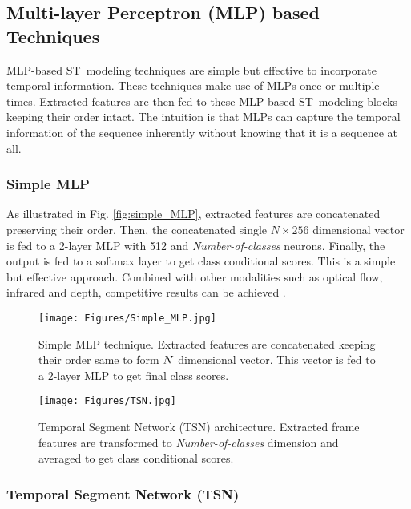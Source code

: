 \documentclass[runningheads]{llncs}
\begin{document}
\subsection{Multi-layer Perceptron (MLP) based Techniques}

MLP-based ST~modeling techniques are simple but effective to incorporate temporal information. These techniques make use of MLPs once or multiple times. Extracted features are then fed to these MLP-based ST~modeling blocks keeping their order intact. The intuition is that MLPs can capture the temporal information of the sequence inherently without knowing that it is a sequence at all.   

\subsubsection{Simple MLP} 

As illustrated in Fig. \ref{fig:simple_MLP}, extracted features are concatenated preserving their order. Then, the concatenated single $N \times 256$ dimensional vector is fed to a 2-layer MLP with 512 and \textit{Number-of-classes} neurons. Finally, the output is fed to a softmax layer to get class conditional scores. This is a simple but effective approach. Combined with other modalities such as optical flow, infrared and depth, competitive results can be achieved \cite{kopuklu2018motion}.


\begin{figure}[t!]
\begin{minipage}[b]{0.475\linewidth}
\centering
	\texttt{[image: Figures/Simple\_MLP.jpg]}
\caption{Simple MLP technique. Extracted features are concatenated keeping their order same to form $N \time 256$ dimensional vector. This vector is fed to a 2-layer MLP to get final class scores.}
\label{fig:simple_MLP}
\end{minipage}
\hfill
\begin{minipage}[b]{0.475\linewidth}
\centering
    \texttt{[image: Figures/TSN.jpg]}
\caption{Temporal Segment Network (TSN) architecture. Extracted frame features are transformed to \textit{Number-of-classes} dimension and averaged to get class conditional scores.}
\label{fig:TSN_arch}
\end{minipage}
\end{figure}




\subsubsection{Temporal Segment Network (TSN)} 
\end{document}
